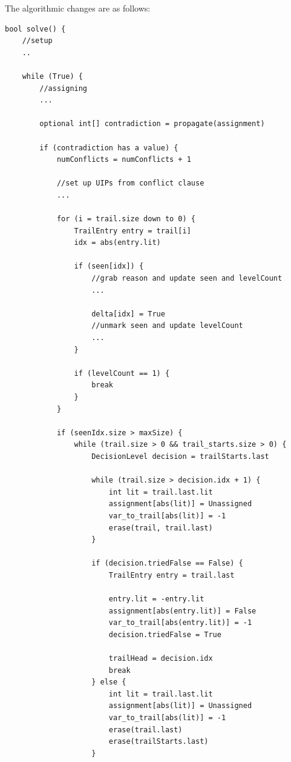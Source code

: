 \documentclass[oneside]{book}
\begin{document}
The algorithmic changes are as follows:
\begin{lstlisting}
bool solve() {
    //setup
    ..

    while (True) {
        //assigning
        ...

        optional int[] contradiction = propagate(assignment)

        if (contradiction has a value) {
            numConflicts = numConflicts + 1

            //set up UIPs from conflict clause
            ...

            for (i = trail.size down to 0) {
                TrailEntry entry = trail[i]
                idx = abs(entry.lit)

                if (seen[idx]) {
                    //grab reason and update seen and levelCount
                    ...

                    delta[idx] = True
                    //unmark seen and update levelCount
                    ...
                }

                if (levelCount == 1) {
                    break
                }
            }

            if (seenIdx.size > maxSize) {
                while (trail.size > 0 && trail_starts.size > 0) {
                    DecisionLevel decision = trailStarts.last

                    while (trail.size > decision.idx + 1) {
                        int lit = trail.last.lit
                        assignment[abs(lit)] = Unassigned
                        var_to_trail[abs(lit)] = -1
                        erase(trail, trail.last)
                    }

                    if (decision.triedFalse == False) {
                        TrailEntry entry = trail.last

                        entry.lit = -entry.lit
                        assignment[abs(entry.lit)] = False
                        var_to_trail[abs(entry.lit)] = -1
                        decision.triedFalse = True

                        trailHead = decision.idx
                        break
                    } else {
                        int lit = trail.last.lit
                        assignment[abs(lit)] = Unassigned
                        var_to_trail[abs(lit)] = -1
                        erase(trail.last)
                        erase(trailStarts.last)
                    }
                    

\end{lstlisting}
\end{document}
